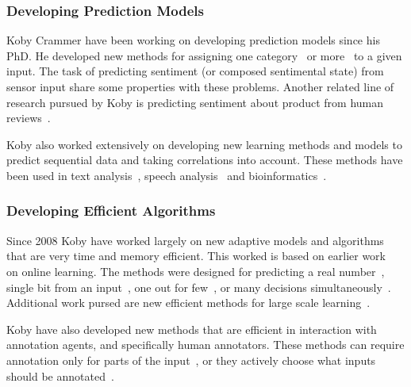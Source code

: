 \documentclass[12pt]{article}
\begin{document}
\subsubsection*{Developing Prediction Models}
Koby Crammer have been working on developing prediction models since his PhD. He developed new methods for assigning one category~\cite{CrammerSi00,CrammerSi00a,CrammerSi01,CrammerSi01a,CrammerDrKu09,DBLP:journals/jmlr/LivniCG12,DBLP:conf/icml/WangCV10,DBLP:conf/ijcai/VatashskyC13,DBLP:journals/jmlr/WangCV12}
 or more~\cite{CrammerSi03,DBLP:conf/naacl/McDonaldCP05} to a given input. The task of predicting sentiment (or composed sentimental state) from sensor input share some properties with these problems. Another related line of research pursued by Koby is predicting sentiment about product from human reviews~\cite{DBLP:journals/jmlr/HaimovitchCM12,dredze-ml-09,DBLP:journals/ml/CrammerKD13}. 
  
 Koby also worked extensively on developing new learning methods and models to predict sequential data and taking correlations into account. These methods have been used in text analysis~\cite{mcdonald-04,mejer2010confidence}, speech analysis~\cite{DBLP:conf/icassp/CrammerL12,DBLP:conf/icassp/Crammer10} and bioinformatics~\cite{DBLP:journals/bioinformatics/BernalCP12,DBLP:journals/ploscb/BernalCHP07,DBLP:journals/bmcbi/LiuCPR08}.


\subsubsection*{Developing Efficient Algorithms}
Since 2008 Koby have worked largely on new adaptive models and algorithms that are very time and memory efficient. This worked is based on earlier work~\cite{DBLP:journals/jmlr/CrammerDKSS06} on online learning. The methods were designed for predicting a real number~\cite{CrammerKuDr12,MoroshkoC12}, single bit from an input~\cite{DBLP:journals/ml/CrammerKD13,Crammer:2012:CLC:2343676.2343704,DBLP:conf/nips/CrammerL10}, one out for few~\cite{CrammerDrKu09,dredze-ml-09}, or many decisions simultaneously~\cite{mejer2012training,DBLP:conf/icassp/CrammerL12}. Additional work pursed are new efficient methods for large scale learning~\cite{DBLP:conf/icml/WangCV10,DBLP:journals/jmlr/WangCV12}.

Koby have also developed new methods that are efficient in interaction with annotation agents, and specifically human annotators. These methods can require annotation only for parts of the input~\cite{DBLP:journals/jmlr/HaimovitchCM12,DBLP:conf/pkdd/OrbachC12,OrbachCr12ieeei}, or they actively choose what inputs should be annotated~\cite{dredze-08b,DBLP:journals/ml/CrammerG13,mejer2012training}.
\end{document}
